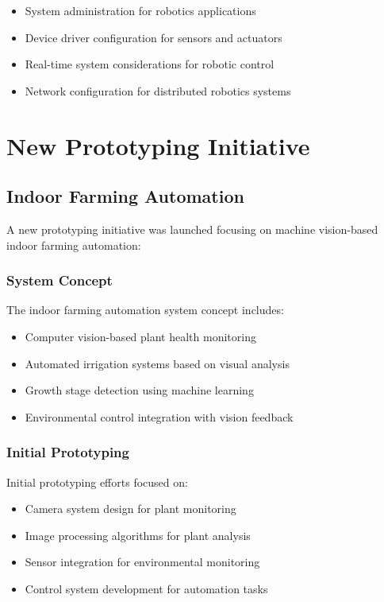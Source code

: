 \documentclass{book}
\begin{document}
\begin{itemize}
\item System administration for robotics applications
\item Device driver configuration for sensors and actuators
\item Real-time system considerations for robotic control
\item Network configuration for distributed robotics systems
\end{itemize}

\section{New Prototyping Initiative}

\subsection{Indoor Farming Automation}
\par\noindent A new prototyping initiative was launched focusing on machine vision-based indoor farming automation:

\subsubsection{System Concept}
\par\noindent The indoor farming automation system concept includes:

\begin{itemize}
\item Computer vision-based plant health monitoring
\item Automated irrigation systems based on visual analysis
\item Growth stage detection using machine learning
\item Environmental control integration with vision feedback
\end{itemize}

\subsubsection{Initial Prototyping}
\par\noindent Initial prototyping efforts focused on:

\begin{itemize}
\item Camera system design for plant monitoring
\item Image processing algorithms for plant analysis
\item Sensor integration for environmental monitoring
\item Control system development for automation tasks
\end{itemize}
\end{document}
